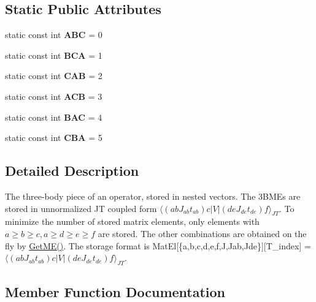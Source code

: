 \subsection*{Static Public Attributes}
\begin{DoxyCompactItemize}
\item 
\mbox{\label{classThreeBodyME_a3401531854606f2b356cdbf97804a9f6}} 
static const int {\bfseries A\+BC} = 0
\item 
\mbox{\label{classThreeBodyME_a57df3dacbddf285f492d990af6bf1cb0}} 
static const int {\bfseries B\+CA} = 1
\item 
\mbox{\label{classThreeBodyME_a3c3c9f20ec16cda131c0b0ef8650c001}} 
static const int {\bfseries C\+AB} = 2
\item 
\mbox{\label{classThreeBodyME_a47c82cf88b9a62c580a067c8988e4788}} 
static const int {\bfseries A\+CB} = 3
\item 
\mbox{\label{classThreeBodyME_afc5c6d62cda9ccbaa806f93fe3c72930}} 
static const int {\bfseries B\+AC} = 4
\item 
\mbox{\label{classThreeBodyME_a5456e8ec32778c76f5b3a1ef3db6edb3}} 
static const int {\bfseries C\+BA} = 5
\end{DoxyCompactItemize}


\subsection{Detailed Description}
The three-\/body piece of an operator, stored in nested vectors. The 3\+B\+M\+Es are stored in unnormalized JT coupled form $ \langle (abJ_{ab}t_{ab})c | V | (deJ_{de}t_{de})f \rangle_{JT} $. To minimize the number of stored matrix elements, only elements with $ a\geq b \geq c, a\geq d\geq e \geq f $ are stored. The other combinations are obtained on the fly by \hyperlink{classThreeBodyME_abd4f77aa9d0981c3ad1a61c2b2c54246}{Get\+M\+E()}. The storage format is Mat\+El\mbox{[}\{a,b,c,d,e,f,J,Jab,Jde\}\mbox{]}\mbox{[}T\+\_\+index\mbox{]} = $ \langle (abJ_{ab}t_{ab})c | V | (deJ_{de}t_{de})f \rangle_{JT} $. 

\subsection{Member Function Documentation}
\mbox{\label{classThreeBodyME_a682fbbfd17bc166f16f8361190ca27d4}} 
